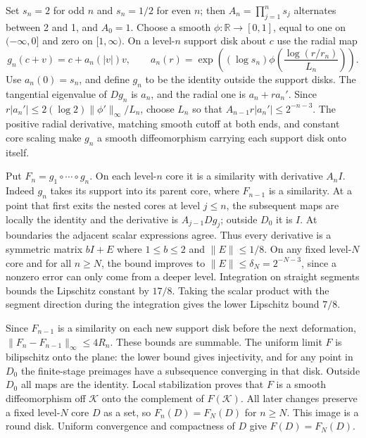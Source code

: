 \documentclass[11pt,a4paper]{amsart}
\newcommand{\R}{\mathbb R}
\newcommand{\Cset}{\mathcal K}
\begin{document}
Set \(s_n=2\) for odd \(n\) and \(s_n=1/2\) for even \(n\); then \(A_n=\prod_{j=1}^n s_j\) alternates between 2 and 1, and \(A_0=1\). Choose a smooth \(\phi:\R\to[0,1]\), equal to one on \((-\infty,0]\) and zero on \([1,\infty)\). On a level-\(n\) support disk about \(c\) use the radial map
\[
 g_n(c+v)=c+a_n(|v|)v,\qquad
 a_n(r)=\exp\!\left((\log s_n)\phi\!\left(\frac{\log(r/r_n)}{L_n}\right)\right).
\]
Use \(a_n(0)=s_n\), and define \(g_n\) to be the identity outside the support disks. The tangential eigenvalue of \(Dg_n\) is \(a_n\), and the radial one is \(a_n+ra_n'\). Since
\(r|a_n'|\le 2(\log 2)\|\phi'\|_\infty/L_n\), choose \(L_n\) so that
\(A_{n-1}r|a_n'|\le2^{-n-3}\).
The positive radial derivative, matching smooth cutoff at both ends, and constant core scaling make \(g_n\) a smooth diffeomorphism carrying each support disk onto itself.

Put \(F_n=g_1\circ\cdots\circ g_n\). On each level-\(n\) core it is a similarity with derivative \(A_n I\). Indeed \(g_n\) takes its support into its parent core, where \(F_{n-1}\) is a similarity. At a point that first exits the nested cores at level \(j\le n\), the subsequent maps are locally the identity and the derivative is \(A_{j-1}Dg_j\); outside \(D_0\) it is \(I\). At boundaries the adjacent scalar expressions agree. Thus every derivative is a symmetric matrix \(bI+E\) where \(1\le b\le2\) and \(\|E\|\le1/8\). On any fixed level-\(N\) core and for all \(n\ge N\), the bound improves to \(\|E\|\le\delta_N=2^{-N-3}\), since a nonzero error can only come from a deeper level. Integration on straight segments bounds the Lipschitz constant by \(17/8\). Taking the scalar product with the segment direction during the integration gives the lower Lipschitz bound \(7/8\).

Since \(F_{n-1}\) is a similarity on each new support disk before the next deformation,
\(\|F_n-F_{n-1}\|_\infty\le4R_n\).
These bounds are summable. The uniform limit \(F\) is bilipschitz onto the plane: the lower bound gives injectivity, and for any point in \(D_0\) the finite-stage preimages have a subsequence converging in that disk. Outside \(D_0\) all maps are the identity. Local stabilization proves that \(F\) is a smooth diffeomorphism off \(\Cset\) onto the complement of \(F(\Cset)\). All later changes preserve a fixed level-\(N\) core \(D\) as a set, so \(F_n(D)=F_N(D)\) for \(n\ge N\). This image is a round disk. Uniform convergence and compactness of \(D\) give \(F(D)=F_N(D)\).
\end{document}
